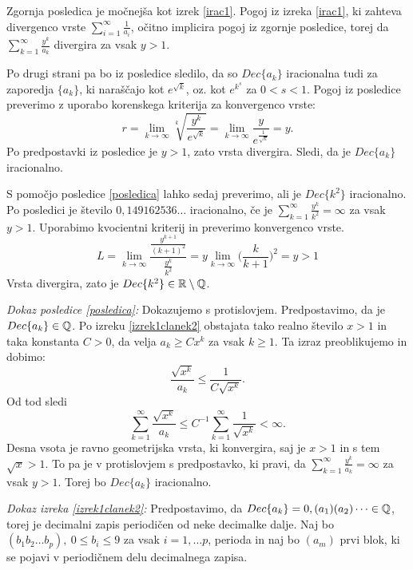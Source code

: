 \documentclass[twoside,11pt]{article}
\begin{document}
Zgornja posledica je močnejša kot izrek \ref{irac1}. 
Pogoj iz izreka \ref{irac1}, ki zahteva divergenco vrste
$\sum_{i=1}^{\infty} \frac{1}{a_i}$, očitno implicira
pogoj iz zgornje posledice, torej da $\sum_{k=1}^{\infty}\frac{y^k}{a_k}$
divergira za vsak $y > 1$.

Po drugi strani pa bo iz posledice sledilo, da so $Dec\{a_k\}$ iracionalna tudi za zaporedja
$\{a_k\}$, ki naraščajo kot $e^{\sqrt{k}}$, oz. kot $e^{k^s}$ za $0 < s < 1$. 
Pogoj iz posledice preverimo z uporabo korenskega kriterija za konvergenco vrste:
\[
    r = \lim_{k \rightarrow \infty}\sqrt[k]{\frac{y^k}{e^{\sqrt{k}}}} = \lim_{k \rightarrow \infty}\frac{y}{e^{\frac{1}{\sqrt{k}}}}
    = y.
\]
Po predpostavki iz posledice je $y > 1$, zato vrsta divergira. 
Sledi, da je $Dec\{a_k\}$ iracionalno.
\\

\begin{zgled}
    S pomočjo posledice \ref{posledica} lahko sedaj preverimo, ali je $Dec\{k^2\}$ iracionalno.
    Po posledici je število $0,149162536\dots$ iracionalno, če je $\sum_{k=1}^{\infty}\frac{y^k}{k^2} = \infty$
    za vsak $y > 1$. Uporabimo kvocientni kriterij in preverimo konvergenco vrste.
    \[
        L = \lim_{k \rightarrow \infty} \frac{\frac{y^{k+1}}{(k+1)^2}}{\frac{y^k}{k^2}}
        = y \lim_{k \rightarrow \infty} \big (\frac{k}{k + 1}\big)^2 = y > 1
    \]
    Vrsta divergira, zato je $Dec\{k^2\} \in \mathbb{R} \setminus \mathbb{Q}$.
\end{zgled}

\noindent
{\em Dokaz posledice \ref{posledica}:\/}
Dokazujemo s protislovjem. Predpostavimo, da je $Dec\{a_k\} \in \mathbb{Q}$.
Po izreku \ref{izrek1clanek2} obstajata tako realno število $x > 1$ in taka konstanta $C>0$, da velja
$a_k \geq Cx^k$ za vsak $k \geq 1$. Ta izraz preoblikujemo in dobimo:
\[
    \frac{\sqrt{x^k}}{a_k} \leq \frac{1}{C\sqrt{x^k}}.\] 
Od tod sledi
\[ \sum_{k=1}^{\infty} \frac{\sqrt{x^k}}{a_k} \leq C^{-1} \sum_{k=1}^{\infty} \frac{1}{\sqrt{x^k}} < \infty.\]
Desna vsota je ravno geometrijska vrsta, ki konvergira, saj je $x > 1$ in s tem $\sqrt{x} > 1$.
To pa je v protislovjem s predpostavko, ki pravi, da $\sum_{k=1}^{\infty}\frac{y^k}{a_k} = \infty$ za vsak $y>1$.
Torej bo $Dec\{a_k\}$ iracionalno.

\QED

\noindent
{\em Dokaz izreka \ref{izrek1clanek2}:\/} Predpostavimo, da $Dec\{a_k\} = 0,(a_1)(a_2)\dots \in \mathbb{Q}$,
 torej je decimalni zapis periodičen od neke decimalke dalje. Naj bo
$(b_1b_2 \dots b_p), \ 0 \leq b_i \leq 9$ za vsak $i = 1, \dots p$, perioda in naj bo
$(a_m)$ prvi blok, ki se pojavi v periodičnem delu decimalnega zapisa.
\end{document}
